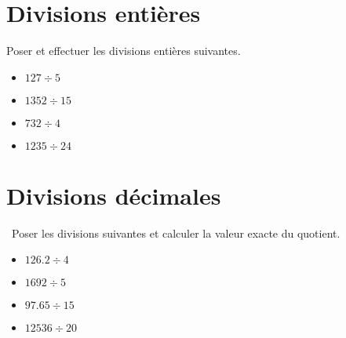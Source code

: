 
	\section{Divisions entières}
	

	\begin{questions}
	
		\question[8] Poser et effectuer les divisions entières suivantes.
		\begin{multicols}{2}
			\begin{itemize}
				\item $127 \div 5$ 
				\item $1352 \div 15$ 
				\item $732 \div 4$
				\item $1235 \div 24$
			\end{itemize}
	\end{multicols}
			\fillwithdottedlines{15cm}	
		
		
		
	\end{questions}	

\section{Divisions décimales}


\begin{questions}
	
	\question[12]  Poser les divisions suivantes et calculer la valeur exacte du quotient.
	\begin{multicols}{2}
	\begin{itemize}
		\item $\num{126,2} \div 4$ 
		\item $1692 \div 5$ 
		\item $\num{97.65} \div 15$
		\item $12536 \div 20$
	\end{itemize}
	\end{multicols}
	\fillwithdottedlines{18cm}
	
\end{questions}